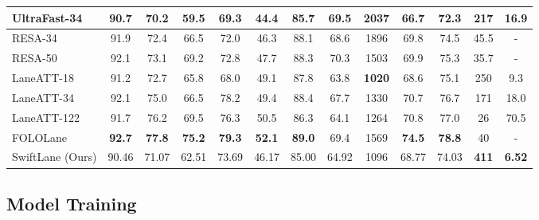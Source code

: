 \documentclass[conference]{IEEEtran}
\begin{document}
\begin{table*}[t]
\begin{center}
\begin{tabular}{|@{}l|c|c|c|c|c|c|c|c|c|c|c|@{}c|}
 UltraFast-34\cite{qin2020ultra}    & 90.7          & 70.2          & 59.5          & 69.3          & 44.4          & 85.7          & \textbf{69.5} & 2037          & 66.7          & 72.3          & 217   & 16.9 \\
 \hline
RESA-34 \cite{resa_2020}         & 91.9          & 72.4          & 66.5          & 72.0          & 46.3          & 88.1          & 68.6          & 1896          & 69.8          & 74.5          & 45.5  & - \\
 RESA-50 \cite{resa_2020}         & 92.1          & 73.1          & 69.2          & 72.8          & 47.7          & 88.3          & 70.3          & 1503          & 69.9          & 75.3          & 35.7  & - \\
\hline
 LaneATT-18\cite{tabelini2021keep}  & 91.2          & 72.7          & 65.8          & 68.0          & 49.1          & 87.8          & 63.8          & \textbf{1020} & 68.6          & 75.1          & 250   & 9.3 \\
 LaneATT-34\cite{tabelini2021keep}  & 92.1          & 75.0          & 66.5          & 78.2          & 49.4          & 88.4          & 67.7          & 1330          & 70.7          & 76.7          & 171   & 18.0\\
 LaneATT-122\cite{tabelini2021keep} & 91.7          & 76.2          & 69.5          & 76.3          & 50.5          & 86.3          & 64.1          & 1264          & 70.8          & 77.0          & 26    & 70.5\\
 \hline
FOLOLane \cite{FOLO_2021_CVPR}    & \textbf{92.7} & \textbf{77.8} & \textbf{75.2} & \textbf{79.3} & \textbf{52.1} & \textbf{89.0} & 69.4          & 1569          & \textbf{74.5} & \textbf{78.8} & 40    & -\\
\hline
 SwiftLane (Ours)                   & 90.46         & 71.07         & 62.51         & 73.69         & 46.17         & 85.00         & 64.92         & 1096          & 68.77         & 74.03         & \textbf{411} & \textbf{6.52}\\
 \hline

\end{tabular} 
\vspace{-2ex}
\end{center}
\end{table*}


\subsection{Model Training}
\label{ssec:imp_details}
\end{document}
